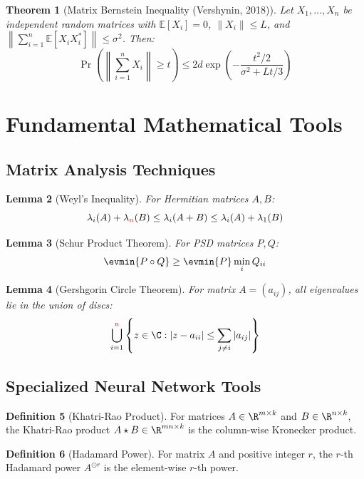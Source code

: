 \documentclass[a4paper]{article}
\newcommand{\E}{\mathbb{E}}
\theoremstyle{plain}
\newtheorem{theorem}{Theorem}[section]
\newtheorem{lemma}[theorem]{Lemma}
\theoremstyle{definition}
\newtheorem{definition}[theorem]{Definition}
\theoremstyle{remark}
\begin{document}
\begin{theorem}[Matrix Bernstein Inequality (Vershynin, 2018)]
Let $X_1, \ldots, X_n$ be independent random matrices with $\E[X_i] = 0$, $\|X_i\| \leq L$, and $\left\|\sum_{i=1}^n \E[X_i X_i^*]\right\| \leq \sigma^2$. Then:
$$\Pr\left(\left\|\sum_{i=1}^n X_i\right\| \geq t\right) \leq 2d \exp\left(-\frac{t^2/2}{\sigma^2 + Lt/3}\right)$$
\end{theorem}

\section{Fundamental Mathematical Tools}

\subsection{Matrix Analysis Techniques}

\begin{lemma}[Weyl's Inequality]
For Hermitian matrices $A, B$:
$$\lambda_i(A) + \lambda_{\textcolor{red}{n}}(B) \leq \lambda_i(A + B) \leq \lambda_i(A) + \lambda_1(B)$$
\end{lemma}

\begin{lemma}[Schur Product Theorem]
For PSD matrices $P, Q$:
$$\evmin{P \circ Q} \geq \evmin{P} \min_i Q_{ii}$$
\end{lemma}

\begin{lemma}[Gershgorin Circle Theorem]
For matrix $A = (a_{ij})$, all eigenvalues lie in the union of discs:
$$\bigcup_{i=1}^{\textcolor{red}{n}} \left\{z \in \C : |z - a_{ii}| \leq \sum_{j \neq i} |a_{ij}|\right\}$$
\end{lemma}

\subsection{Specialized Neural Network Tools}

\begin{definition}[Khatri-Rao Product]
For matrices $A \in \R^{m \times k}$ and $B \in \R^{n \times k}$, the Khatri-Rao product $A \star B \in \R^{mn \times k}$ is the column-wise Kronecker product.
\end{definition}

\begin{definition}[Hadamard Power]
For matrix $A$ and positive integer $r$, the $r$-th Hadamard power $A^{\odot r}$ is the element-wise $r$-th power.
\end{definition}
\end{document}
